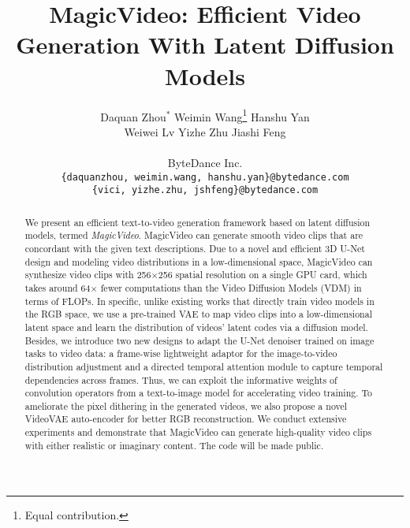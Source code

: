 \documentclass[10pt,twocolumn,letterpaper]{article}
\begin{document}
\title{ MagicVideo: Efficient Video Generation With Latent Diffusion Models}

\author{
  Daquan Zhou$^*$ \quad Weimin Wang\thanks{Equal contribution.} \quad Hanshu Yan\\ \quad Weiwei Lv \quad Yizhe Zhu \quad Jiashi Feng \\
  \\
  ByteDance Inc. \\
  \texttt{\{{daquanzhou, weimin.wang, hanshu.yan\}@bytedance.com}} \\
  \texttt{\{{vici, yizhe.zhu, jshfeng\}@bytedance.com}} \\
  }

\maketitle
\ificcvfinal\thispagestyle{empty}\fi


\begin{abstract}
   We present an efficient text-to-video generation framework based on latent diffusion models, termed \emph{MagicVideo}. MagicVideo can generate smooth video clips that are concordant with the given text descriptions. Due to a novel and efficient 3D U-Net design and modeling video distributions in a low-dimensional space, MagicVideo can synthesize video clips with  256$\times$256 spatial resolution on a single GPU card, which takes around 64$\times$ fewer computations than the Video Diffusion Models (VDM) in terms of FLOPs. 
   In specific, unlike existing works that directly train video models in the RGB space, we use a pre-trained VAE to map video clips into a low-dimensional latent space and learn the distribution of videos' latent codes via a diffusion model. 
Besides, we introduce two new designs to adapt the U-Net denoiser trained on image tasks to video data: a frame-wise lightweight adaptor for the image-to-video distribution adjustment and a directed temporal attention module to capture temporal dependencies across frames. Thus, we can exploit the informative weights of convolution operators from a text-to-image model for accelerating video training.
   To ameliorate the pixel dithering in the generated videos, we also propose a novel VideoVAE auto-encoder for better RGB reconstruction. 
   We conduct extensive experiments and demonstrate that MagicVideo can generate high-quality video clips with either realistic or imaginary content. The code will be made public.
\end{abstract}
\end{document}

